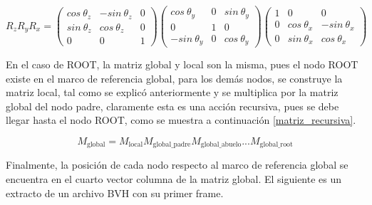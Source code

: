 \begin{equation}\label{matriz_rotacion}
R_z R_y R_x = 
\begin{pmatrix}
 cos\ \theta_z & - sin\ \theta_z & 0 \\
 sin\ \theta_z & cos\ \theta_z & 0 \\
 0 & 0 & 1 
\end{pmatrix}
\begin{pmatrix}
 cos\ \theta_y & 0 & sin\ \theta_y \\
 0 & 1 & 0 \\
 - sin\ \theta_y & 0 & cos\ \theta_y 
\end{pmatrix}
\begin{pmatrix}
 1 & 0 & 0 \\
 0 & cos\ \theta_x & - sin\ \theta_x \\
 0 & sin\ \theta_x & cos\ \theta_x 
\end{pmatrix}
\end{equation}

En el caso de ROOT, la matriz global y local son la misma, pues el nodo ROOT existe en el marco de referencia global, para los demás nodos, se construye la matriz local, tal como se explicó anteriormente y se multiplica por la matriz global del nodo padre, claramente esta es una acción recursiva, pues se debe llegar hasta el nodo ROOT, como se muestra a continuación \eqref{matriz_recursiva}.

\begin{equation}\label{matriz_recursiva}
    M_{\text{global}} = M_{\text{local}} M_{\text{global\_padre}} M_{\text{global\_abuelo}} ... M_{\text{global\_root}}
\end{equation}

Finalmente, la posición de cada nodo respecto al marco de referencia global se encuentra en el cuarto vector columna de la matriz global. 
    El siguiente es un extracto de un archivo BVH con su primer frame.

